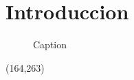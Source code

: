 \section{Introduccion}
\lipsum[1-2]

\begin{figure}[H]
    \centering
    \caption{Caption}
    \label{fig:enter-label}
\end{figure}
\begin{textblock}{30}(164,263) 
  \noindent

\end{textblock}